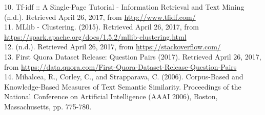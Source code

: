 \documentclass[9pt,twocolumn,twoside]{idsi}
\begin{document}
10. Tf-idf :: A Single-Page Tutorial - Information Retrieval and Text Mining (n.d.). Retrieved April 26, 2017, from \url{http://www.tfidf.com/} \\
11. MLlib - Clustering. (2015). Retrieved April 26, 2017, from \url{https://spark.apache.org/docs/1.5.2/mllib-clustering.html}\\
12. (n.d.). Retrieved April 26, 2017, from \url{https://stackoverflow.com/} \\
13. First Quora Dataset Release: Question Pairs (2017). Retrieved April 26, 2017, from \url{https://data.quora.com/First-Quora-Dataset-Release-Question-Pairs} \\
14. Mihalcea, R., Corley, C., and Strapparava, C. (2006). Corpus-Based and Knowledge-Based Measures of Text Semantic Similarity. Proceedings of the National Conference on Artificial Intelligence (AAAI 2006), Boston, Massachusetts, pp. 775-780.
\end{document}
